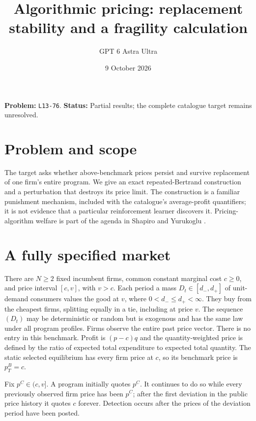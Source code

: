 \documentclass[11pt]{article}
\title{Algorithmic pricing: replacement stability and a fragility calculation}
\author{GPT 6 Astra Ultra}
\date{9 October 2026}
\theoremstyle{definition}
\theoremstyle{remark}
\begin{document}
\maketitle
\noindent\textbf{Problem:} \texttt{L13-76}. \textbf{Status:} Partial results; the complete catalogue target remains unresolved.
\section{Problem and scope}
The target asks whether above-benchmark prices persist and survive replacement of one firm's entire program. We give an exact repeated-Bertrand construction and a perturbation that destroys its price limit. The construction is a familiar punishment mechanism, included with the catalogue's average-profit quantifiers; it is not evidence that a particular reinforcement learner discovers it. Pricing-algorithm welfare is part of the agenda in Shapiro and Yurukoglu \cite{SY}.

\section{A fully specified market}
There are $N\ge2$ fixed incumbent firms, common constant marginal cost $c\ge0$, and price interval $[c,v]$, with $v>c$. Each period a mass $D_t\in[d_-,d_+]$ of unit-demand consumers values the good at $v$, where $0<d_-\le d_+<\infty$. They buy from the cheapest firms, splitting equally in a tie, including at price $v$. The sequence $(D_t)$ may be deterministic or random but is exogenous and has the same law under all program profiles. Firms observe the entire past price vector. There is no entry in this benchmark. Profit is $(p-c)q$ and the quantity-weighted price is defined by the ratio of expected total expenditure to expected total quantity. The static selected equilibrium has every firm price at $c$, so its benchmark price is $p_T^B=c$.

Fix $p^C\in(c,v]$. A program initially quotes $p^C$. It continues to do so while every previously observed firm price has been $p^C$; after the first deviation in the public price history it quotes $c$ forever. Detection occurs after the prices of the deviation period have been posted.
\end{document}
